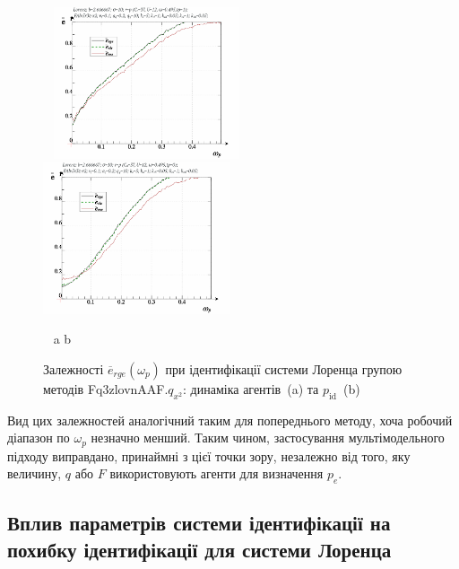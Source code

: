 \begin{figure}[ht!]
  \begin{center}
    ~ \hfill
    \includegraphics[width=0.49\textwidth]{p/cha/lor/Fq3zlovnAAF/lor_Fq3zlovnAAF_qx2-p_omega_p_e_sign.png}
    \hfill
    \includegraphics[width=0.49\textwidth]{p/cha/lor/Fq3zlovnAAF/lor_Fq3zlovnAAF_qx2-p_omega_p_e_sin.png}
    \hfill ~
  \end{center}
  \vspace{-1.0ex}
  \begin{center}
    ~ \hfill a \hfill\hfill b \hfill ~
  \end{center}
  \vspace{-1.5ex}
  \caption{Залежності $ \overline{e}_{rge} (\omega_p) $ при ідентифікації системи Лоренца групою методів Fq3zlovnAAF.$q_{x^2} $: динаміка агентів~(a) та $p_\mathrm{id}$~(b)}
\label{atu:f:lor_Fq3zlovnAAF_e_omega_p}
\end{figure}

Вид цих залежностей аналогічний таким для попереднього методу,
хоча робочий діапазон по
$ \omega_p $ незначно менший. Таким чином, застосування мультімодельного
підходу виправдано, принаймні з цієї точки зору, незалежно
від того, яку величину,
$ q $ або
$ F $ використовують агенти для визначення
$ p_e $.




\subsection{Вплив параметрів системи ідентифікації на похибку ідентифікації для системи Лоренца} %

